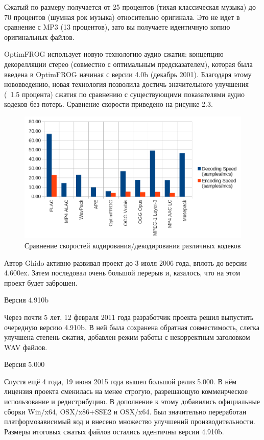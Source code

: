 \documentclass[12pt,a4paper,oneside]{report}
\begin{document}
Сжатый по размеру получается от 25 процентов (тихая классическая музыка) до 70 процентов (шумная рок музыка) относительно оригинала. Это не идет в сравнение с MP3 (13 процентов), зато вы получаете идентичную копию оригинальных файлов.

OptimFROG использует новую технологию аудио сжатия: концепцию декорелляции стерео (совместно с оптимальным предсказателем), которая была введена в OptimFROG начиная с версии 4.0b (декабрь 2001). Благодаря этому нововведению, новая технология позволила достичь значительного улучшения (~1.5 процента) сжатия по сравнению с существующими показателями аудио кодеков без потерь. Сравнение скорости приведено на рисунке 2.3.

\begin{figure}[!htbp]
	\centering
	\includegraphics[scale=0.5]{optifrogbest.png}
	\caption{Сравнение скоростей кодирования/декодирования различных кодеков}
	\label{ris:optifrogbest}
\end{figure}

Автор Ghido активно развивал проект до 3 июля 2006 года, вплоть до версии 4.600ex. Затем последовал очень большой перерыв и, казалось, что на этом проект будет заброшен.

Версия 4.910b

Через почти 5 лет, 12 февраля 2011 года разработчик проекта решил выпустить очередную версию 4.910b. В ней была сохранена обратная совместимость, слегка улучшена степень сжатия, добавлен режим работы с некорректным заголовком WAV файлов.

Версия 5.000

Спустя ещё 4 года, 19 июня 2015 года вышел большой релиз 5.000. В нём лицензия проекта сменилась на менее строгую, разрешающую комменрческое использование и редистрибуцию. В дополнение к этому добавились официальные сборки Win/x64, OSX/x86+SSE2 и OSX/x64. Был значительно переработан платформозависимый код и внесено множество улучшений производительности. Размеры итоговых сжатых файлов остались идентичны версии 4.910b.
\end{document}
